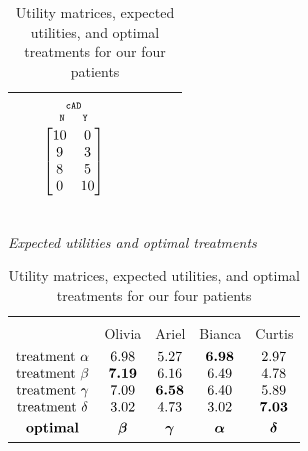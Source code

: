 \documentclass[a4paper,12pt,%
onecolumn,oneside,article,%
british%
]{memoir}
\theoremstyle{remark}
\theoremstyle{innote}
\renewcommand*{\|}[1][]{\nonscript\:#1\vert\nonscript\:\mathopen{}}
\newcommand*{\cad}{\texttt{cAD}}
\newcommand*{\yes}{\texttt{Y}}
\newcommand*{\no}{\texttt{N}}
\begin{document}
\begin{table}
\begin{tabular}{lccccccc}
    &&
    $\begin{gathered}
      {\scriptstyle\cad}\\[-2\jot]
      \begin{smallmatrix}
        \no\enspace &\enspace\yes
      \end{smallmatrix}\\[-\jot]
      \begin{bmatrix}10&0\\9&3\\8&5\\0&10\end{bmatrix}\end{gathered}$
    \\[6\jot]
    \hline
  \end{tabular}
\\[1em]
  \textit{Expected utilities and optimal treatments}\\
  \begin{tabular}{lcccc}
    \hline\\[-1.5\jot]
    &{\small Olivia} &{\small Ariel} &{\small Bianca} &{\small Curtis}
    \\[\jot]
    $\begin{matrix}
      \text{treatment }\alpha\\ 
      \text{treatment }\beta\\ 
      \text{treatment }\gamma\\ 
      \text{treatment }\delta\\[\jot]
      \textbf{optimal}
    \end{matrix}$
    &
    $\begin{matrix}6.98\\\bm{7.19}\\7.09\\3.02\\[\jot]\bm{\beta}\end{matrix}$
    &
    $\begin{matrix}5.27\\6.16\\\bm{6.58}\\4.73\\[\jot]\bm{\gamma}\end{matrix}$
    &
    $\begin{matrix}\bm{6.98}\\6.49\\6.40\\3.02\\[\jot]\bm{\alpha}\end{matrix}$
    &
    $\begin{matrix}2.97\\4.78\\5.89\\\bm{7.03}\\[\jot]\bm{\delta}\end{matrix}$
    \\[5\jot]
    \hline
  \end{tabular}
  \caption{Utility matrices, expected utilities, and optimal treatments for our four patients}\label{tab:utilities_patients}
\end{table}
\end{document}
